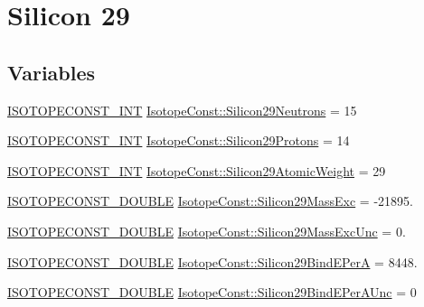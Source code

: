 \hypertarget{group___isotope_const-_silicon-_si29}{}\section{Silicon 29}
\label{group___isotope_const-_silicon-_si29}
\subsection*{Variables}
\begin{DoxyCompactItemize}
\item 
\mbox{\hyperlink{group___isotope_const-_macros_ga5f18360b3e99483a35c32d789e62621c}{I\+S\+O\+T\+O\+P\+E\+C\+O\+N\+S\+T\+\_\+\+I\+NT}} \mbox{\hyperlink{group___isotope_const-_silicon-_si29_ga2ef1c48cb6609d20f783412d6c0e50f2}{Isotope\+Const\+::\+Silicon29\+Neutrons}} = 15
\item 
\mbox{\hyperlink{group___isotope_const-_macros_ga5f18360b3e99483a35c32d789e62621c}{I\+S\+O\+T\+O\+P\+E\+C\+O\+N\+S\+T\+\_\+\+I\+NT}} \mbox{\hyperlink{group___isotope_const-_silicon-_si29_ga3e955405ebeab6a603b1e450aa6a5d2c}{Isotope\+Const\+::\+Silicon29\+Protons}} = 14
\item 
\mbox{\hyperlink{group___isotope_const-_macros_ga5f18360b3e99483a35c32d789e62621c}{I\+S\+O\+T\+O\+P\+E\+C\+O\+N\+S\+T\+\_\+\+I\+NT}} \mbox{\hyperlink{group___isotope_const-_silicon-_si29_ga05ddd69682d91a3ed44b913597b9f6b3}{Isotope\+Const\+::\+Silicon29\+Atomic\+Weight}} = 29
\item 
\mbox{\hyperlink{group___isotope_const-_macros_ga8f45a7272ce02c0b4c65c44636ed719a}{I\+S\+O\+T\+O\+P\+E\+C\+O\+N\+S\+T\+\_\+\+D\+O\+U\+B\+LE}} \mbox{\hyperlink{group___isotope_const-_silicon-_si29_gad9193498f0dc98d0a7ef27ee801a5be2}{Isotope\+Const\+::\+Silicon29\+Mass\+Exc}} = -\/21895.
\item 
\mbox{\hyperlink{group___isotope_const-_macros_ga8f45a7272ce02c0b4c65c44636ed719a}{I\+S\+O\+T\+O\+P\+E\+C\+O\+N\+S\+T\+\_\+\+D\+O\+U\+B\+LE}} \mbox{\hyperlink{group___isotope_const-_silicon-_si29_ga0aadaf61278e378b84f3b164918e49bd}{Isotope\+Const\+::\+Silicon29\+Mass\+Exc\+Unc}} = 0.
\item 
\mbox{\hyperlink{group___isotope_const-_macros_ga8f45a7272ce02c0b4c65c44636ed719a}{I\+S\+O\+T\+O\+P\+E\+C\+O\+N\+S\+T\+\_\+\+D\+O\+U\+B\+LE}} \mbox{\hyperlink{group___isotope_const-_silicon-_si29_gaab1df50e8c17e7055b2373fb2207a29e}{Isotope\+Const\+::\+Silicon29\+Bind\+E\+PerA}} = 8448.
\item 
\mbox{\hyperlink{group___isotope_const-_macros_ga8f45a7272ce02c0b4c65c44636ed719a}{I\+S\+O\+T\+O\+P\+E\+C\+O\+N\+S\+T\+\_\+\+D\+O\+U\+B\+LE}} \mbox{\hyperlink{group___isotope_const-_silicon-_si29_gac7b18bde96f70fbb1284d7fdc0f03352}{Isotope\+Const\+::\+Silicon29\+Bind\+E\+Per\+A\+Unc}} = 0

\end{DoxyCompactItemize}
